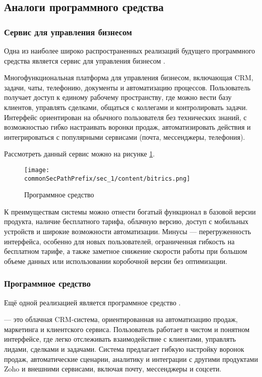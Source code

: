 \subsection{Аналоги программного средства}

\subsubsection{Сервис для управления бизнесом \analogBitrics}

Одна из наиболее широко распространенных реализаций будущего программного средства является сервис для управления
бизнесом \analogBitrics.

Многофункциональная платформа для управления бизнесом, включающая CRM, задачи, чаты, телефонию, документы и
автоматизацию процессов. Пользователь получает доступ к единому рабочему пространству, где можно вести базу
клиентов, управлять сделками, общаться с коллегами и контролировать задачи. Интерфейс ориентирован на обычного
пользователя без технических знаний, с возможностью гибко настраивать воронки продаж, автоматизировать действия
и интегрироваться с популярными сервисами (почта, мессенджеры, телефония).

Рассмотреть данный сервис можно на рисунке \ref{fig:bitrics}.

\begin{figure}[ht]
    \centering
    \texttt{[image: \\commonSecPathPrefix/sec\_1/content/bitrics.png]}
    \caption{Программное средство \analogBitrics}
    \label{fig:bitrics}
\end{figure}

К преимуществам системы можно отнести богатый функционал в базовой версии продукта, наличие бесплатного тарифа, облачную 
версию, доступ с мобильных устройств и широкие возможности автоматизации. Минусы — перегруженность интерфейса, особенно для
новых пользователей, ограниченная гибкость на бесплатном тарифе, а также заметное снижение скорости работы при большом
объеме данных или использовании коробочной версии без оптимизации.

\subsubsection{Программное средство \analogZoho}

Ещё одной реализацией является программное средство \analogZoho.

{\analogZoho} — это облачная CRM-система, ориентированная на автоматизацию продаж, маркетинга и клиентского сервиса. 
Пользователь работает в чистом и понятном интерфейсе, где легко отслеживать взаимодействие с клиентами, управлять лидами, 
сделками и задачами. Система предлагает гибкую настройку воронок продаж, автоматические сценарии, аналитику и интеграции с 
другими продуктами Zoho и внешними сервисами, включая почту, мессенджеры и соцсети.

